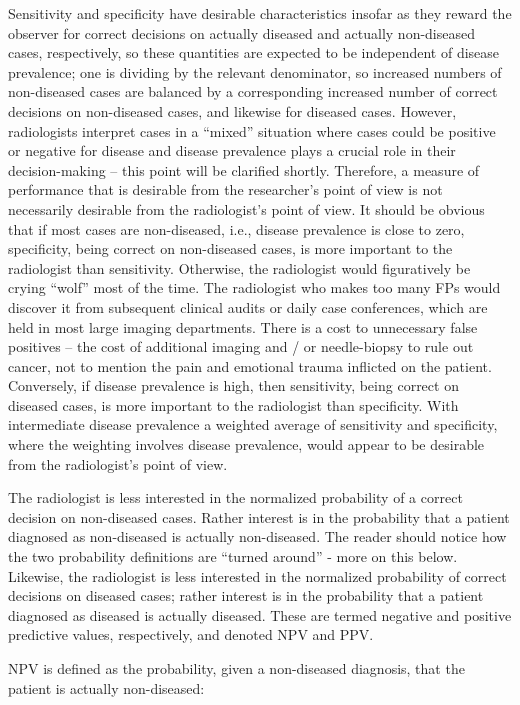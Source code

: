 \documentclass[
]{book}
\begin{document}
Sensitivity and specificity have desirable characteristics insofar as they reward the observer for correct decisions on actually diseased and actually non-diseased cases, respectively, so these quantities are expected to be independent of disease prevalence; one is dividing by the relevant denominator, so increased numbers of non-diseased cases are balanced by a corresponding increased number of correct decisions on non-diseased cases, and likewise for diseased cases. However, radiologists interpret cases in a ``mixed'' situation where cases could be positive or negative for disease and disease prevalence plays a crucial role in their decision-making -- this point will be clarified shortly. Therefore, a measure of performance that is desirable from the researcher's point of view is not necessarily desirable from the radiologist's point of view. It should be obvious that if most cases are non-diseased, i.e., disease prevalence is close to zero, specificity, being correct on non-diseased cases, is more important to the radiologist than sensitivity. Otherwise, the radiologist would figuratively be crying ``wolf'' most of the time. The radiologist who makes too many FPs would discover it from subsequent clinical audits or daily case conferences, which are held in most large imaging departments. There is a cost to unnecessary false positives -- the cost of additional imaging and / or needle-biopsy to rule out cancer, not to mention the pain and emotional trauma inflicted on the patient. Conversely, if disease prevalence is high, then sensitivity, being correct on diseased cases, is more important to the radiologist than specificity. With intermediate disease prevalence a weighted average of sensitivity and specificity, where the weighting involves disease prevalence, would appear to be desirable from the radiologist's point of view.

The radiologist is less interested in the normalized probability of a correct decision on non-diseased cases. Rather interest is in the probability that a patient diagnosed as non-diseased is actually non-diseased. The reader should notice how the two probability definitions are ``turned around'' - more on this below. Likewise, the radiologist is less interested in the normalized probability of correct decisions on diseased cases; rather interest is in the probability that a patient diagnosed as diseased is actually diseased. These are termed negative and positive predictive values, respectively, and denoted NPV and PPV.

NPV is defined as the probability, given a non-diseased diagnosis, that the patient is actually non-diseased:
\end{document}
